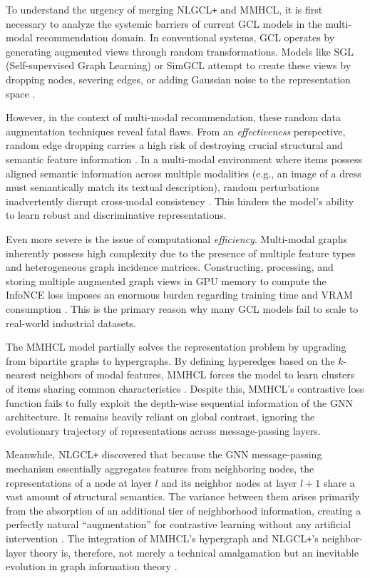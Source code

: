    To understand the urgency of merging NLGCL\texttt{+} and MMHCL, it is first necessary to analyze the systemic barriers of current GCL models in the multi-modal recommendation domain. In conventional systems, GCL operates by generating augmented views through random transformations. Models like SGL (Self-supervised Graph Learning) or SimGCL attempt to create these views by dropping nodes, severing edges, or adding Gaussian noise to the representation space \cite{bachman2019miacrossviews}.
    
    However, in the context of multi-modal recommendation, these random data augmentation techniques reveal fatal flaws. From an \textit{effectiveness} perspective, random edge dropping carries a high risk of destroying crucial structural and semantic feature information \cite{raj2025unlockingmultimodal}. In a multi-modal environment where items possess aligned semantic information across multiple modalities (e.g., an image of a dress must semantically match its textual description), random perturbations inadvertently disrupt cross-modal consistency \cite{zhang2025mllmrec}. This hinders the model's ability to learn robust and discriminative representations.
    
    Even more severe is the issue of computational \textit{efficiency}. Multi-modal graphs inherently possess high complexity due to the presence of multiple feature types and heterogeneous graph incidence matrices. Constructing, processing, and storing multiple augmented graph views in GPU memory to compute the InfoNCE loss imposes an enormous burden regarding training time and VRAM consumption \cite{openreview2025hypergraphquantization}. This is the primary reason why many GCL models fail to scale to real-world industrial datasets.
    
    The MMHCL model \cite{guo2025mmhcl} partially solves the representation problem by upgrading from bipartite graphs to hypergraphs. By defining hyperedges based on the $k$-nearest neighbors of modal features, MMHCL forces the model to learn clusters of items sharing common characteristics \cite{han2025biviewhypergraph}. Despite this, MMHCL's contrastive loss function fails to fully exploit the depth-wise sequential information of the GNN architecture. It remains heavily reliant on global contrast, ignoring the evolutionary trajectory of representations across message-passing layers.
    
    Meanwhile, NLGCL\texttt{+} discovered that because the GNN message-passing mechanism essentially aggregates features from neighboring nodes, the representations of a node at layer $l$ and its neighbor nodes at layer $l+1$ share a vast amount of structural semantics. The variance between them arises primarily from the absorption of an additional tier of neighborhood information, creating a perfectly natural ``augmentation'' for contrastive learning without any artificial intervention \cite{feng2025nlgcl}. The integration of MMHCL's hypergraph and NLGCL\texttt{+}'s neighbor-layer theory is, therefore, not merely a technical amalgamation but an inevitable evolution in graph information theory \cite{ma2025particlesystemhypergraph}.
    

